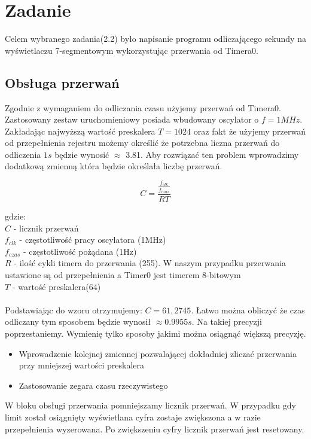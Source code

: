 \documentclass[12pt]{article}
\begin{document}
\section{Zadanie}
Celem wybranego zadania(2.2) było napisanie programu odliczającego sekundy na wyświetlaczu 7-segmentowym wykorzystując przerwania od Timera0.

\subsection{Obsługa przerwań}
Zgodnie z wymaganiem do odliczania czasu użyjemy przerwań od Timera0. Zastosowany zestaw uruchomieniowy posiada wbudowany oscylator o $f=1MHz$. Zakładając najwyższą wartość preskalera $T = 1024$ oraz fakt że użyjemy przerwań od przepełnienia rejestru możemy określić że potrzebna liczna przerwań do odliczenia $1s$ będzie wynosić $\approx$ 3.81. Aby rozwiązać ten problem wprowadzimy dodatkową zmienną która będzie określała liczbę przerwań.

\[C = \frac{\frac{f_{clk}}{f_{czas}}}{R T}\]

gdzie:\\
$C$ - licznik przerwań\\
$f_{clk}$ - częstotliwość pracy oscylatora (1MHz)\\
$f_{czas}$ - częstotliwość pożądana (1Hz)\\
$R$ - ilość cykli timera do przerwania (255). W naszym przypadku przerwania ustawione są od przepełnienia a Timer0 jest timerem 8-bitowym\\
$T$ - wartość preskalera(64)\\
\\[0.5cm]
Podstawiając do wzoru otrzymujemy: $C = 61,2745$.
Łatwo można obliczyć że czas odliczany tym sposobem będzie wynosił $\approx0.9955s$. Na takiej precyzji poprzestaniemy. Wymienię tylko sposoby jakimi można osiągnąć większą precyzję.
\begin{itemize}
\item Wprowadzenie kolejnej zmiennej pozwalającej dokładniej zliczać przerwania przy mniejszej wartości preskalera
\item Zastosowanie zegara czasu rzeczywistego
\end{itemize}

W bloku obsługi przerwania pomniejszamy licznik przerwań. W przypadku gdy limit został osiągnięty wyświetlana cyfra zostaje zwiększona a w razie przepełnienia wyzerowana. Po zwiększeniu cyfry licznik przerwań jest resetowany. 
\end{document}
